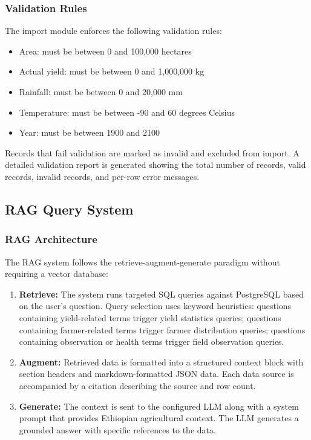 \subsubsection{Validation Rules}

The import module enforces the following validation rules:
\begin{itemize}
  \item Area: must be between 0 and 100,000 hectares
  \item Actual yield: must be between 0 and 1,000,000 kg
  \item Rainfall: must be between 0 and 20,000 mm
  \item Temperature: must be between -90 and 60 degrees Celsius
  \item Year: must be between 1900 and 2100
\end{itemize}

Records that fail validation are marked as invalid and excluded from import. A detailed validation report is generated showing the total number of records, valid records, invalid records, and per-row error messages.

\subsection{RAG Query System}

\subsubsection{RAG Architecture}

The RAG system follows the retrieve-augment-generate paradigm without requiring a vector database:

\begin{enumerate}
  \item \textbf{Retrieve:} The system runs targeted SQL queries against PostgreSQL based on the user's question. Query selection uses keyword heuristics: questions containing yield-related terms trigger yield statistics queries; questions containing farmer-related terms trigger farmer distribution queries; questions containing observation or health terms trigger field observation queries.
  
  \item \textbf{Augment:} Retrieved data is formatted into a structured context block with section headers and markdown-formatted JSON data. Each data source is accompanied by a citation describing the source and row count.
  
  \item \textbf{Generate:} The context is sent to the configured LLM along with a system prompt that provides Ethiopian agricultural context. The LLM generates a grounded answer with specific references to the data.
\end{enumerate}

